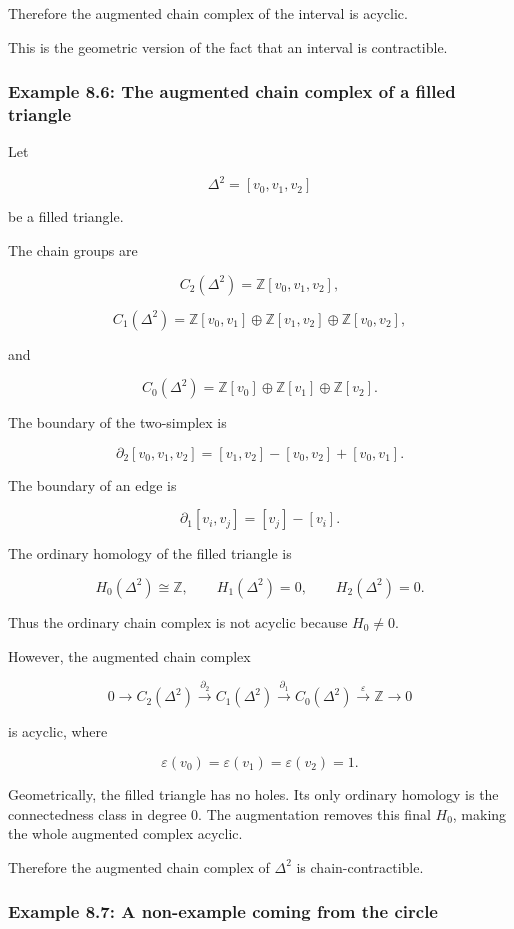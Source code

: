 \documentclass[12pt,a4paper]{article}
\theoremstyle{notespace}
\begin{document}
Therefore the augmented chain complex of the interval is acyclic.

This is the geometric version of the fact that an interval is contractible.

\subsubsection{Example 8.6: The augmented chain complex of a filled triangle}

Let

\[
\Delta^2=[v_0,v_1,v_2]
\]

be a filled triangle.

The chain groups are

\[
C_2(\Delta^2)=\mathbb Z[v_0,v_1,v_2],
\]

\[
C_1(\Delta^2)
=
\mathbb Z[v_0,v_1]
\oplus
\mathbb Z[v_1,v_2]
\oplus
\mathbb Z[v_0,v_2],
\]

and

\[
C_0(\Delta^2)
=
\mathbb Z[v_0]\oplus \mathbb Z[v_1]\oplus \mathbb Z[v_2].
\]

The boundary of the two-simplex is

\[
\partial_2[v_0,v_1,v_2]
=
[v_1,v_2]-[v_0,v_2]+[v_0,v_1].
\]

The boundary of an edge is

\[
\partial_1[v_i,v_j]=[v_j]-[v_i].
\]

The ordinary homology of the filled triangle is

\[
H_0(\Delta^2)\cong \mathbb Z,
\qquad
H_1(\Delta^2)=0,
\qquad
H_2(\Delta^2)=0.
\]

Thus the ordinary chain complex is not acyclic because \(H_0\neq 0\).

However, the augmented chain complex

\[
0\longrightarrow C_2(\Delta^2)
\xrightarrow{\partial_2}
C_1(\Delta^2)
\xrightarrow{\partial_1}
C_0(\Delta^2)
\xrightarrow{\varepsilon}
\mathbb Z
\longrightarrow 0
\]

is acyclic, where

\[
\varepsilon(v_0)=\varepsilon(v_1)=\varepsilon(v_2)=1.
\]

Geometrically, the filled triangle has no holes. Its only ordinary homology is the connectedness class in degree \(0\). The augmentation removes this final \(H_0\), making the whole augmented complex acyclic.

Therefore the augmented chain complex of \(\Delta^2\) is chain-contractible.

\subsubsection{Example 8.7: A non-example coming from the circle}
\end{document}
